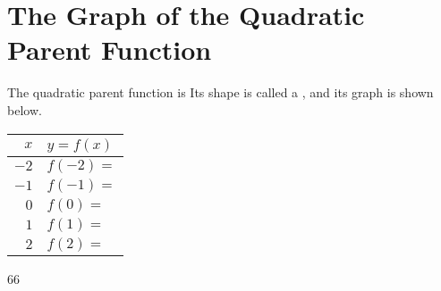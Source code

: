 \section{The Graph of the Quadratic Parent Function}

The quadratic parent function is 
\myCenteredBox[width=2in,valign=center]{
    \Large
    \vspace{-0.75em}
    \[ f(x) = x^2 \]
}
%
Its shape is called a , 
and its graph is shown below.

\begin{minipage}{0.5\textwidth}
    \centering 
    \renewcommand{\arraystretch}{1.75}
    \begin{tabular}{r|p{2in}}
        $x$ & $y = f(x)$ \\ \hline\hline
        $-2$ & $f(-2) = $\\ \hline
        $-1$ & $f(-1) = $\\ \hline
        $0$ & $f(0) = $  \\ \hline
        $1$ & $f(1) = $  \\ \hline
        $2$ & $f(2) = $  \\ \hline
    \end{tabular}
\end{minipage}
\begin{minipage}{0.5\textwidth}
    \centering
    \begin{myTikzpictureGrid}{0.4} {6}{6}
    \end{myTikzpictureGrid}
\end{minipage}
